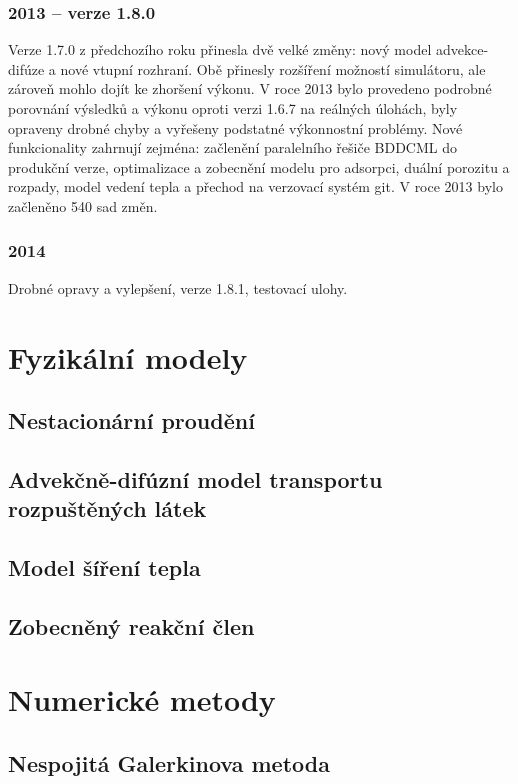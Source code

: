 \documentclass[11pt]{article}
\begin{document}
\subsubsection{2013 -- verze 1.8.0}
Verze 1.7.0 z předchozího roku přinesla dvě velké změny: nový model 
advekce-difúze a nové vtupní rozhraní. Obě přinesly rozšíření možností 
simulátoru, ale zároveň mohlo dojít ke zhoršení výkonu. V roce 2013 bylo 
provedeno podrobné porovnání výsledků a výkonu oproti verzi 1.6.7 na reálných 
úlohách, byly opraveny drobné chyby a vyřešeny podstatné výkonnostní problémy.  
Nové funkcionality zahrnují zejména: začlenění paralelního řešiče BDDCML do 
produkční verze, optimalizace a zobecnění modelu pro adsorpci, duální porozitu a 
rozpady, model vedení tepla a přechod na verzovací systém git. V roce 2013 bylo 
začleněno 540 sad změn.
\subsubsection{2014}
Drobné opravy a vylepšení, verze 1.8.1, testovací ulohy.

\section{Fyzikální modely}
\subsection{Nestacionární proudění}

\subsection{Advekčně-difúzní model transportu rozpuštěných látek}
\label{sc:transport_model}


\subsection{Model šíření tepla}


\subsection{Zobecněný reakční člen}

\section{Numerické metody}
\subsection{Nespojitá Galerkinova metoda}
\end{document}
